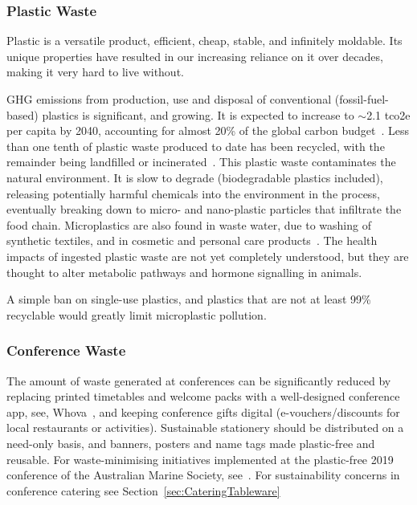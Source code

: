 \documentclass[../SustainableHEP.tex]{subfiles}
\begin{document}
\subsubsection{Plastic Waste}
Plastic is a versatile product, efficient, cheap, stable, and infinitely moldable.  Its unique properties have resulted in our increasing reliance on it over decades, making it very hard to live without. 

GHG emissions from production, use and disposal of conventional (fossil-fuel-based) plastics is significant, and growing.  It is expected to increase to $\sim$2.1 \acrshort{tco2e} per capita by 2040, accounting for almost 20\% of the global carbon budget~\cite{UNPollutionSolution}.  Less than one tenth of plastic waste produced to date has been recycled, with the remainder being landfilled or incinerated~\cite{UNPollutionSolution}.  This plastic waste contaminates the natural environment.  It is slow to degrade (biodegradable plastics included), releasing potentially harmful chemicals into the environment in the process, eventually breaking down to micro- and nano-plastic particles that infiltrate the food chain.  Microplastics are also found in waste water, due to washing of synthetic textiles, and in cosmetic and personal care products~\cite{Microplastics}.  The health impacts of ingested plastic waste are not yet completely understood, but they are thought to alter metabolic pathways and hormone signalling in animals.

A simple ban on single-use plastics, and plastics that are not at least 99\% recyclable would greatly limit microplastic pollution. 

\subsubsection{Conference Waste\label{sec:ConferenceWaste}}

The amount of waste generated at conferences can be significantly reduced by replacing printed timetables and welcome packs with a well-designed conference app, see, \eg Whova~\cite{Whova}, and keeping conference gifts digital (\eg e-vouchers/discounts for local restaurants or activities).    Sustainable stationery should be distributed on a need-only basis, and banners, posters and name tags made plastic-free and reusable.  For waste-minimising initiatives implemented at the plastic-free 2019 conference of the Australian Marine Society, see~.  For sustainability concerns in conference catering see Section~\ref{sec:CateringTableware}
\end{document}
